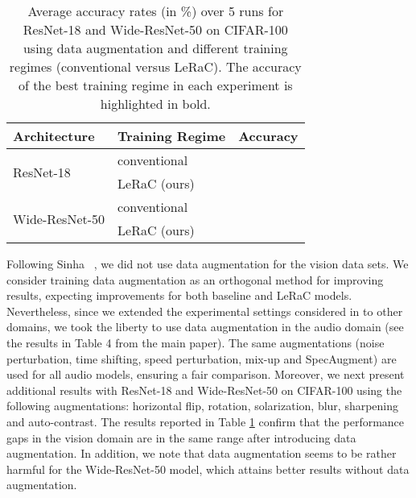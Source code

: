 \documentclass[10pt,twocolumn,letterpaper]{article}
\begin{document}
\begin{table}[t]
  \small{
\begin{center}
  \begin{tabular}{llc}
    \toprule
    Architecture  & Training Regime     & Accuracy \\
    \midrule
     \multirow{2}{*}{ResNet-18}              & conventional             &  \\
                                &                LeRaC (ours)              & \\
    \midrule
    \multirow{2}{*}{Wide-ResNet-50}              & conventional             &  \\
                                               & LeRaC (ours)              & \\
    \bottomrule
  \end{tabular}
    \end{center}
    }
      \vspace{-0.6cm}
    \caption{Average accuracy rates (in \%) over 5 runs for ResNet-18 and Wide-ResNet-50 on CIFAR-100 using data augmentation and different training regimes (conventional versus LeRaC). The accuracy of the best training regime in each experiment is highlighted in bold.}
  \label{tab_vision_aug}
\end{table}

Following Sinha \etal~\cite{Sinha-NIPS-2020}, we did not use data augmentation for the vision data sets. We consider training data augmentation as an orthogonal method for improving results, expecting improvements for both baseline and LeRaC models. Nevertheless, since we extended the experimental settings considered in \cite{Sinha-NIPS-2020} to other domains, we took the liberty to use data augmentation in the audio domain (see the results in Table 4 from the main paper). The same augmentations (noise perturbation, time shifting, speed perturbation, mix-up and SpecAugment) are used for all audio models, ensuring a fair comparison. Moreover, we next present additional results with ResNet-18 and Wide-ResNet-50 on CIFAR-100 using the following augmentations: horizontal flip, rotation, solarization, blur, sharpening and auto-contrast. The results reported in Table \ref{tab_vision_aug} confirm that the performance gaps in the vision domain are in the same range after introducing data augmentation. In addition, we note that data augmentation seems to be rather harmful for the Wide-ResNet-50 model, which attains better results without data augmentation.
\end{document}
